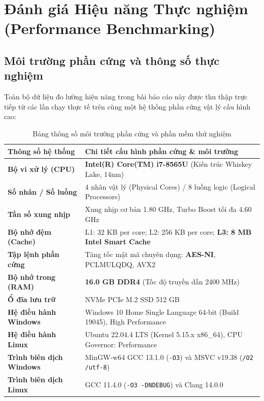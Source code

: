 \documentclass[12pt, a4paper]{report}
\begin{document}
\section{Đánh giá Hiệu năng Thực nghiệm (Performance Benchmarking)}
\label{sec:performance}

\subsection{Môi trường phần cứng và thông số thực nghiệm}
Toàn bộ dữ liệu đo lường hiệu năng trong bài báo cáo này được thu thập trực tiếp từ các lần chạy thực tế trên cùng một hệ thống phần cứng vật lý cấu hình cao:

\begin{table}[H]
\centering
\small
\caption{Bảng thông số môi trường phần cứng và phần mềm thử nghiệm}
\label{tab:hw}
\begin{tabular}{p{4.0cm} p{10.5cm}}
\toprule
\textbf{Thông số hệ thống} & \textbf{Chi tiết cấu hình phần cứng \& môi trường} \\
\midrule
\textbf{Bộ vi xử lý (CPU)} & \textbf{Intel(R) Core(TM) i7-8565U} (Kiến trúc Whiskey Lake, 14nm) \\
\textbf{Số nhân / Số luồng} & 4 nhân vật lý (Physical Cores) / 8 luồng logic (Logical Processors) \\
\textbf{Tần số xung nhịp} & Xung nhịp cơ bản 1.80 GHz, Turbo Boost tối đa 4.60 GHz \\
\textbf{Bộ nhớ đệm (Cache)} & L1: 32 KB per core; L2: 256 KB per core; \textbf{L3: 8 MB Intel Smart Cache} \\
\textbf{Tập lệnh phần cứng} & Tăng tốc mật mã chuyên dụng: \textbf{AES-NI}, PCLMULQDQ, AVX2 \\
\textbf{Bộ nhớ trong (RAM)} & \textbf{16.0 GB DDR4} (Tốc độ truyền dẫn 2400 MHz) \\
\textbf{Ổ đĩa lưu trữ} & NVMe PCIe M.2 SSD 512 GB \\
\textbf{Hệ điều hành Windows} & Windows 10 Home Single Language 64-bit (Build 19045), High Performance \\
\textbf{Hệ điều hành Linux} & Ubuntu 22.04.4 LTS (Kernel 5.15.x x86\_64), CPU Governor: Performance \\
\textbf{Trình biên dịch Windows} & MinGW-w64 GCC 13.1.0 (\texttt{-O3}) và MSVC v19.38 (\texttt{/O2 /utf-8}) \\
\textbf{Trình biên dịch Linux} & GCC 11.4.0 (\texttt{-O3 -DNDEBUG}) và Clang 14.0.0 \\
\bottomrule
\end{tabular}
\end{table}
\end{document}
